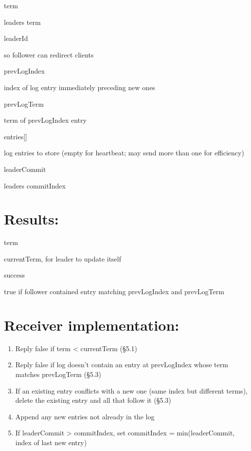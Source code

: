 \documentclass[
]{article}
\providecommand{\tightlist}{%
  \setlength{\itemsep}{0pt}\setlength{\parskip}{0pt}}
\begin{document}
term

leader\textquotesingle s term

leaderId

so follower can redirect clients

prevLogIndex

index of log entry immediately preceding new ones

prevLogTerm

term of prevLogIndex entry

entries{[}{]}

log entries to store (empty for heartbeat; may send more than one for
efficiency)

leaderCommit

leader\textquotesingle s commitIndex

\section{Results:}\label{results}

term

currentTerm, for leader to update itself

success

true if follower contained entry matching prevLogIndex and prevLogTerm

\section{Receiver implementation:}\label{receiver-implementation}

\begin{enumerate}
\def\labelenumi{\arabic{enumi}.}
\tightlist
\item
  Reply false if term \textless{} currentTerm (§5.1)\\
\item
  Reply false if log doesn't contain an entry at prevLogIndex whose term
  matches prevLogTerm (§5.3)\\
\item
  If an existing entry conflicts with a new one (same index but
  different terms), delete the existing entry and all that follow it
  (§5.3)\\
\item
  Append any new entries not already in the log\\
\item
  If leaderCommit \textgreater{} commitIndex, set commitIndex =
  min(leaderCommit, index of last new entry)
\end{enumerate}
\end{document}
